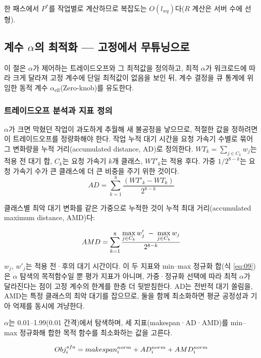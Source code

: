 \documentclass{ieeetj}
\begin{document}
한 패스에서 $P^*$를 작업별로 계산하므로 복잡도는 $O(l_{wq})$다($R$ 계산은 서버 수에 선형).

\subsection{계수 $\alpha$의 최적화 --- 고정에서 무튜닝으로}\label{sec:coeff}
이 절은 $\alpha$가 제어하는 트레이드오프와 그 최적값을 정의하고, 최적 $\alpha$가 워크로드에 따라 크게 달라져 고정 계수에 단일 최적값이 없음을 보인 뒤, 계수 결정을 큐 통계에 위임한 동적 계수 $\alpha_{\text{eff}}$(Zero-knob)를 유도한다.

\subsubsection{트레이드오프 분석과 지표 정의}
$\alpha$가 크면 막혔던 작업이 과도하게 추월해 새 불공정을 낳으므로, 적절한 값을 정하려면 이 트레이드오프를 정량화해야 한다. 작업 누적 대기 시간을 요청 가속기 수별로 묶어 그 변화량을 누적 거리(accumulated distance, AD)로 정의한다. $WT_k=\sum_{j\in C_k} w_j$는 적용 전 대기 합, $C_k$는 요청 가속기 $k$개 클래스, $WT'_k$는 적용 후다. 가중 $1/2^{8-k}$는 요청 가속기 수가 큰 클래스에 더 큰 비중을 주기 위한 것이다. 
\begin{equation}
AD = \sum_{k=1}^8 \frac{(WT'_k - WT_k)}{2^{8-k}}
\label{eq:07}
\end{equation}

클래스별 최악 대기 변화를 같은 가중으로 누적한 것이 누적 최대 거리(accumulated maximum distance, AMD)다:

\begin{equation}
AMD = \sum_{k=1}^8 \frac{\max\limits_{j\in C_k} w'_j \;-\; \max\limits_{j\in C_k} w_j}{2^{8-k}}
\label{eq:08}
\vspace{2pt}
\end{equation}

$w_j$, $w'_j$는 적용 전·후의 대기 시간이다. 이 두 지표와 min--max 정규화 합(식 \eqref{eq:09})은 $\alpha$ 탐색의 목적함수일 뿐 평가 지표가 아니며, 가중·정규화 선택에 따라 최적 $\alpha$가 달라진다는 점이 고정 계수의 한계를 한층 더 뒷받침한다. AD는 전반적 대기 쏠림을, AMD는 특정 클래스의 최악 대기를 잡으므로, 둘을 함께 최소화하면 평균 공정성과 기아 억제를 동시에 겨냥한다.

$\alpha$는 0.01--1.99(0.01 간격)에서 탐색하며, 세 지표(makespan·AD·AMD)를 min--max 정규화해 합한 목적 함수를 최소화하는 값을 고른다.

\begin{equation}
Obj_i^{sfa} = makespan_i^{norm} + AD_i^{norm} + AMD_i^{norm}
\label{eq:09}
\vspace{2pt}
\end{equation}
\end{document}
